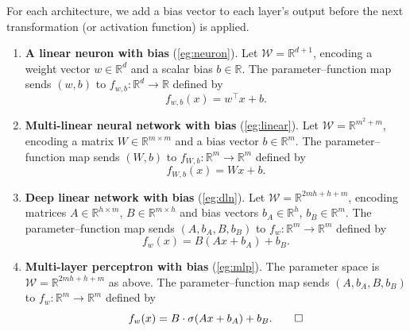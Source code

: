 \documentclass[11pt]{article}
\newcommand{\R}{\mathbb{R}}
\newcommand{\W}{\mathcal{W}}
\begin{document}
\begin{solution}
For each architecture, we add a bias vector to each layer's output before the next transformation (or activation function) is applied.

\begin{enumerate}
    \item \textbf{A linear neuron with bias} (\cref{eg:neuron}).
    Let $\W = \R^{d+1}$, encoding a weight vector $w \in \R^d$ and a scalar bias $b \in \R$. The parameter--function map sends $(w, b)$ to $f_{w,b} : \R^d \to \R$ defined by
    \begin{equation*}
        f_{w,b}(x) = w^\top x + b.
    \end{equation*}

    \item \textbf{Multi-linear neural network with bias} (\cref{eg:linear}).
    Let $\W = \R^{m^2 + m}$, encoding a matrix $W \in \R^{m \times m}$ and a bias vector $b \in \R^m$. The parameter--function map sends $(W, b)$ to $f_{W,b} : \R^m \to \R^m$ defined by
    \begin{equation*}
        f_{W,b}(x) = Wx + b.
    \end{equation*}

    \item \textbf{Deep linear network with bias} (\cref{eg:dln}).
    Let $\W = \R^{2mh + h + m}$, encoding matrices $A \in \R^{h \times m}$, $B \in \R^{m \times h}$ and bias vectors $b_A \in \R^h$, $b_B \in \R^m$. The parameter--function map sends $(A, b_A, B, b_B)$ to $f_w : \R^m \to \R^m$ defined by
    \begin{equation*}
        f_w(x) = B(Ax + b_A) + b_B.
    \end{equation*}

    \item \textbf{Multi-layer perceptron with bias} (\cref{eg:mlp}).
    The parameter space is $\W = \R^{2mh + h + m}$ as above. The parameter--function map sends $(A, b_A, B, b_B)$ to $f_w : \R^m \to \R^m$ defined by
    \begin{equation*}
        f_w(x) = B \cdot \sigma(Ax + b_A) + b_B. \qedhere
    \end{equation*}
\end{enumerate}
\end{solution}
\end{document}

